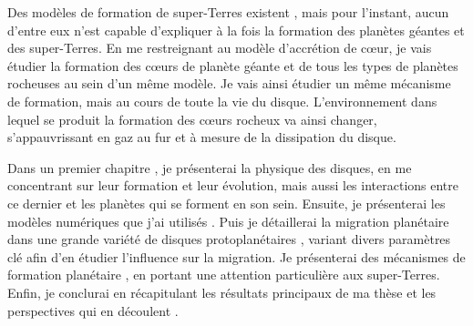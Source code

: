 Des modèles de formation de super-Terres existent \citep{terquem2007migration, chiang2013minimum}, mais pour l'instant, aucun d'entre eux n'est capable d'expliquer à la fois la formation des planètes géantes et des super-Terres.  En me restreignant au modèle d'accrétion de cœur, je vais étudier la formation des cœurs de planète géante et de tous les types de planètes rocheuses au sein d'un même modèle. Je vais ainsi étudier un même mécanisme de formation, mais au cours de toute la vie du disque. L'environnement dans lequel se produit la formation des cœurs rocheux va ainsi changer, s'appauvrissant en gaz au fur et à mesure de la dissipation du disque.

Dans un premier chapitre , je présenterai la physique des disques, en me concentrant sur leur formation et leur évolution, mais aussi les interactions entre ce dernier et les planètes qui se forment en son sein. Ensuite, je
présenterai les modèles numériques que j'ai utilisés . Puis je détaillerai la migration planétaire dans une
grande variété de disques protoplanétaires , variant divers paramètres clé afin d'en étudier l'influence sur
la migration. Je présenterai des mécanismes de formation planétaire , en portant une attention particulière
aux super-Terres. Enfin, je conclurai en récapitulant les résultats principaux de ma thèse et les perspectives qui en découlent
.

